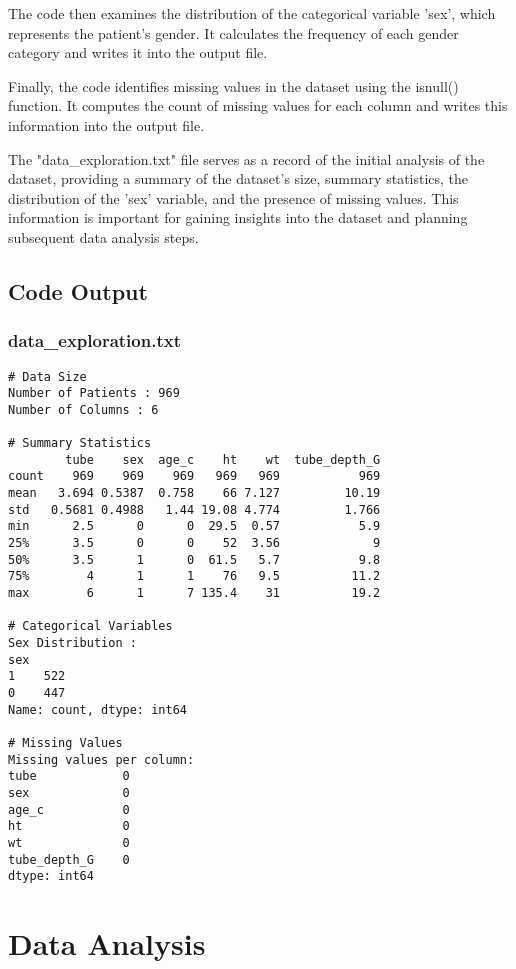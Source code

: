 \documentclass[11pt]{article}
\begin{document}
The code then examines the distribution of the categorical variable 'sex', which represents the patient's gender. It calculates the frequency of each gender category and writes it into the output file.

Finally, the code identifies missing values in the dataset using the isnull() function. It computes the count of missing values for each column and writes this information into the output file.

The "data\_exploration.txt" file serves as a record of the initial analysis of the dataset, providing a summary of the dataset's size, summary statistics, the distribution of the 'sex' variable, and the presence of missing values. This information is important for gaining insights into the dataset and planning subsequent data analysis steps.

\subsection{Code Output}

\subsubsection*{data\_exploration.txt}

\begin{Verbatim}[tabsize=4]
# Data Size
Number of Patients : 969
Number of Columns : 6

# Summary Statistics
        tube    sex  age_c    ht    wt  tube_depth_G
count    969    969    969   969   969           969
mean   3.694 0.5387  0.758    66 7.127         10.19
std   0.5681 0.4988   1.44 19.08 4.774         1.766
min      2.5      0      0  29.5  0.57           5.9
25%      3.5      0      0    52  3.56             9
50%      3.5      1      0  61.5   5.7           9.8
75%        4      1      1    76   9.5          11.2
max        6      1      7 135.4    31          19.2

# Categorical Variables
Sex Distribution :
sex
1    522
0    447
Name: count, dtype: int64

# Missing Values
Missing values per column:
tube            0
sex             0
age_c           0
ht              0
wt              0
tube_depth_G    0
dtype: int64

\end{Verbatim}

\section{Data Analysis}
\end{document}
